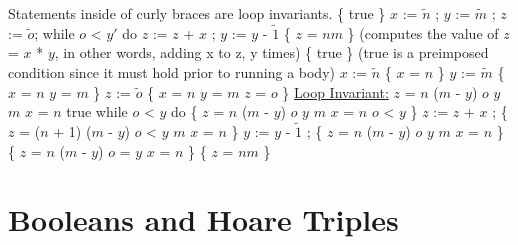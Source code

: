 \documentclass{lecturenotes}
\begin{document}
Statements inside of curly braces are loop invariants. \newline \newline
\{ true \} \newline
$x$ := $\tilde{n}$ ; $y$ := $\tilde{m}$ ; $z$ := $\tilde{o}$; \newline
while $o$ < $y'$ do \newline
$z$ := $z$ + $x$ ; \newline
$y$ := $y$ - $\tilde{1}$ \newline
\{ $z$ = $nm$ \} \newline
(computes the value of $z$ = $x$ * $y$, in other words, adding x to z, y times) \newline
\newline
\{ true \} (true is a preimposed condition since it must hold prior to running a body) \newline
$x$ := $\tilde{n}$ \newline
\{ $x$ = $n$ \} \newline
$y$ := $\tilde{m}$ \newline
\{ $x$ = $n$ \wedge \;$y$ = $m$ \} \newline
$z$ := $\tilde{o}$ \newline
\{ $x$ = $n$ \wedge \;$y$ = $m$ \wedge \;$z$ = $o$ \} \newline
\underline{Loop Invariant:} $z$ = $n$ ($m$ - $y$) \wedge \;$o$ \le \;$y$ \le \;$m$ \wedge \;$x$ = $n$ \rightarrow \; true \newline
\newline
while $o$ < $y$ do \newline
\{ $z$ = $n$ ($m$ - $y$) \wedge \;$o$ \le \;$y$ \le \;$m$ \wedge \;$x$ = $n$ \wedge \;$o$ < $y$ \} \newline
$z$ := $z$ + $x$ ; \newline
\{ $z$ = ($n$ + 1) ($m$ - $y$) \wedge \;$o$ < $y$ \le \;$m$ \wedge \;$x$ = $n$ \} \newline
$y$ := $y$ - $\tilde{1}$ ; \newline
\{ $z$ = $n$ ($m$ - $y$) \wedge \;$o$ \le \;$y$ \le \;$m$ \wedge \;$x$ = $n$ \} \newline
\newline
\{ $z$ = $n$ ($m$ - $y$) \wedge \;$o$ = $y$ \wedge \;$x$ = $n$ \} \newline
\newline
\{ $z$ = $nm$ \} \newline \newline

\section{Booleans and Hoare Triples}
\end{document}
